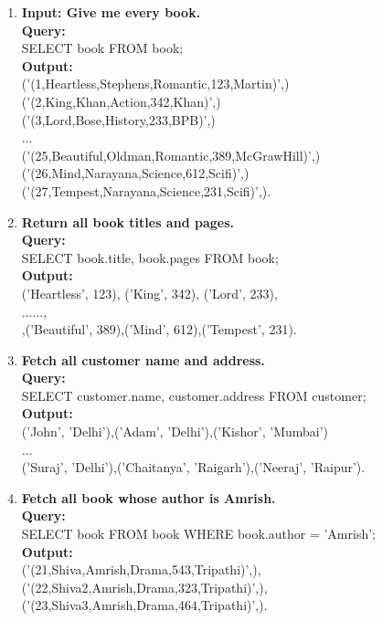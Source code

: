 \begin{enumerate}
\item \textbf{Input: Give me every book.}\\
\textbf{Query:}\\SELECT book FROM book;\\
\textbf{Output:}\\
('(1,Heartless,Stephens,Romantic,123,Martin)',)\\
('(2,King,Khan,Action,342,Khan)',)\\
('(3,Lord,Bose,History,233,BPB)',)\\
...\\
('(25,Beautiful,Oldman,Romantic,389,McGrawHill)',)\\
('(26,Mind,Narayana,Science,612,Scifi)',)\\
('(27,Tempest,Narayana,Science,231,Scifi)',).


\item \textbf{Return all book titles and pages.}\\
\textbf{Query:}\\SELECT book.title, book.pages FROM book;\\
\textbf{Output:}\\
('Heartless', 123), ('King', 342), ('Lord', 233),\\
......,\\
,('Beautiful', 389),('Mind', 612),('Tempest', 231).

\item \textbf{
Fetch all customer name and address.}\\
\textbf{Query:}\\SELECT customer.name, customer.address FROM customer;\\
\textbf{Output:}\\
('John', 'Delhi'),('Adam', 'Delhi'),('Kishor', 'Mumbai')\\
...\\
('Suraj', 'Delhi'),('Chaitanya', 'Raigarh'),('Neeraj', 'Raipur').

\item \textbf{Fetch all book whose author is Amrish.}\\
\textbf{Query:}\\SELECT book FROM book WHERE book.author = 'Amrish';\\
\textbf{Output:}\\
('(21,Shiva,Amrish,Drama,543,Tripathi)',),\\
('(22,Shiva2,Amrish,Drama,323,Tripathi)',),\\
('(23,Shiva3,Amrish,Drama,464,Tripathi)',).


\end{enumerate}

